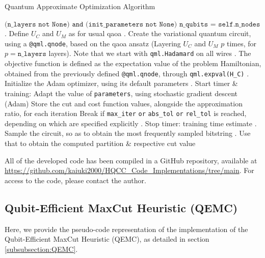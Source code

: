 \begin{algorithm}[H]
   \caption{Quantum Approximate Optimization Algorithm}\label{alg:QAOA}
   \begin{algorithmic}
   \Require $\texttt{(n\_layers not None) and (init\_parameters not None)}$
   \Ensure $\texttt{n\_qubits = self.n\_nodes}$
   . Define $U_C$ and $U_M$ as for usual \acrshort{qaoa}
   . Create the variational quantum circuit, using a \texttt{@qml.qnode}, based on the \acrshort{qaoa} ansatz (Layering $U_C$ and $U_M$ $p$ times, for $p = \texttt{n\_layers}$ layers). Note that we start with \texttt{qml.Hadamard} on all wires
   . The objective function is defined as the expectation value of the problem Hamiltonian, obtained from the previously defined \texttt{@qml.qnode}, through \texttt{qml.expval(H\_C)}
   . Initialize the Adam optimizer, using its default parameters
   . Start timer \& training:
    Adapt the value of \texttt{parameters}, using stochastic gradient descent (Adam)
    Store the cut and cost function values, alongside the approximation ratio, for each iteration
    Break if \texttt{max\_iter} \texttt{or} \texttt{abs\_tol} \texttt{or} \texttt{rel\_tol} is reached, depending on which are specified explicitly
   \EndWhile
   . Stop timer: training time estimate
   . Sample the circuit, so as to obtain the most frequently sampled bitstring
   . Use that to obtain the computed partition \& respective cut value
   \end{algorithmic}
\end{algorithm}

All of the developed code has been compiled in a GitHub repository, available at \url{https://github.com/kaiuki2000/HQCC_Code_Implementations/tree/main}. For access to the code, please contact the author.

\subsection{Qubit-Efficient MaxCut Heuristic (QEMC)}
\label{subsection:QEMC_Implementation}


Here, we provide the pseudo-code representation of the implementation of the Qubit-Efficient MaxCut Heuristic (QEMC), as detailed in section \ref{subsubsection:QEMC}.

